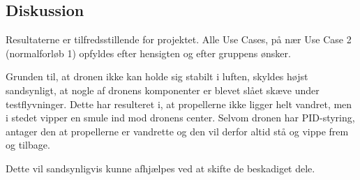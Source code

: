 \documentclass[Main]{subfiles}
\begin{document}
\subsection{Diskussion}
Resultaterne er tilfredsstillende for projektet. 
Alle Use Cases, på nær Use Case 2 (normalforløb 1) opfyldes efter hensigten og efter gruppens ønsker.

Grunden til, at dronen ikke kan holde sig stabilt i luften, skyldes højst sandsynligt, at nogle af dronens komponenter er blevet slået skæve under testflyvninger. 
Dette har resulteret i, at propellerne ikke ligger helt vandret, men i stedet vipper en smule ind mod dronens center.
Selvom dronen har PID-styring, antager den at propellerne er vandrette og den vil derfor altid stå og vippe frem og tilbage.

Dette vil sandsynligvis kunne afhjælpes ved at skifte de beskadiget dele.
\end{document}
